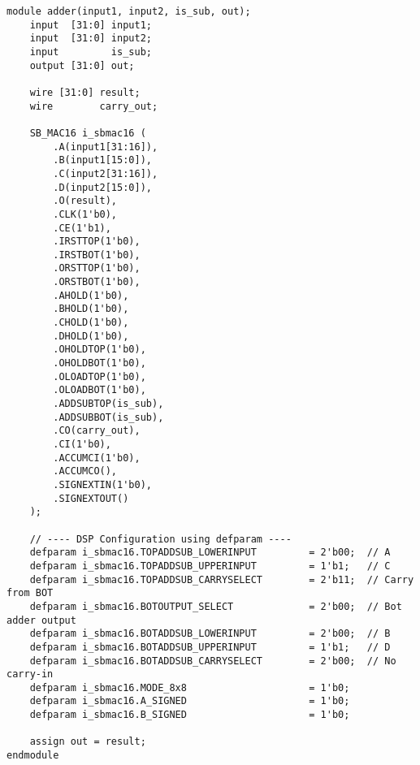 \documentclass[a4paper,10pt]{article}
\begin{document}
\begin{lstlisting}[style=verilog-style, caption=
    {DSP implementation in adder.v}, label={prog:DSP}]
module adder(input1, input2, is_sub, out);
    input  [31:0] input1;
    input  [31:0] input2;
    input         is_sub;
    output [31:0] out;

    wire [31:0] result;
    wire        carry_out;

    SB_MAC16 i_sbmac16 (
        .A(input1[31:16]),  
        .B(input1[15:0]),  
        .C(input2[31:16]), 
        .D(input2[15:0]),  
        .O(result),
        .CLK(1'b0),
        .CE(1'b1),
        .IRSTTOP(1'b0), 
        .IRSTBOT(1'b0),
        .ORSTTOP(1'b0), 
        .ORSTBOT(1'b0),
        .AHOLD(1'b0), 
        .BHOLD(1'b0),
        .CHOLD(1'b0), 
        .DHOLD(1'b0),
        .OHOLDTOP(1'b0),
        .OHOLDBOT(1'b0),
        .OLOADTOP(1'b0), 
        .OLOADBOT(1'b0),
        .ADDSUBTOP(is_sub), 
        .ADDSUBBOT(is_sub),
        .CO(carry_out),
        .CI(1'b0), 
        .ACCUMCI(1'b0),
        .ACCUMCO(), 
        .SIGNEXTIN(1'b0), 
        .SIGNEXTOUT()
    );

    // ---- DSP Configuration using defparam ----
    defparam i_sbmac16.TOPADDSUB_LOWERINPUT         = 2'b00;  // A
    defparam i_sbmac16.TOPADDSUB_UPPERINPUT         = 1'b1;   // C
    defparam i_sbmac16.TOPADDSUB_CARRYSELECT        = 2'b11;  // Carry from BOT
    defparam i_sbmac16.BOTOUTPUT_SELECT             = 2'b00;  // Bot adder output
    defparam i_sbmac16.BOTADDSUB_LOWERINPUT         = 2'b00;  // B
    defparam i_sbmac16.BOTADDSUB_UPPERINPUT         = 1'b1;   // D
    defparam i_sbmac16.BOTADDSUB_CARRYSELECT        = 2'b00;  // No carry-in
    defparam i_sbmac16.MODE_8x8                     = 1'b0;
    defparam i_sbmac16.A_SIGNED                     = 1'b0;
    defparam i_sbmac16.B_SIGNED                     = 1'b0;

    assign out = result;
endmodule
\end{lstlisting}
\end{document}
